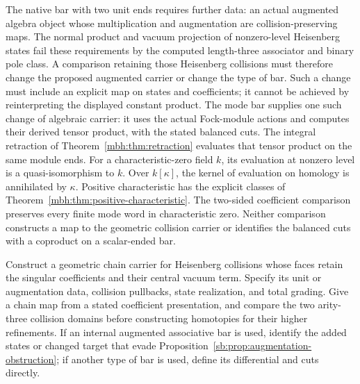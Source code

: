 The native bar with two unit ends requires further data:
an actual augmented algebra object whose multiplication and augmentation
are collision-preserving maps.  The normal product and vacuum projection
of nonzero-level Heisenberg states fail these requirements by the
computed length-three associator and binary pole class.
A comparison retaining those Heisenberg collisions must therefore
change the proposed augmented carrier or change the type of bar.
Such a change must include an explicit map on states and coefficients;
it cannot be achieved by reinterpreting the displayed constant product.
The mode bar supplies one such change of algebraic carrier: it uses
the actual Fock-module actions and computes their derived tensor product,
with the stated balanced cuts.  The integral retraction of
Theorem~\ref{mbh:thm:retraction} evaluates that tensor product on the
same module ends.  For a characteristic-zero field \(k\), its
evaluation at nonzero level is a quasi-isomorphism to \(k\).
Over \(k[\kappa]\), the kernel of evaluation on homology is
annihilated by \(\kappa\).  Positive characteristic has the
explicit classes of
Theorem~\ref{mbh:thm:positive-characteristic}.
The two-sided coefficient comparison preserves every finite mode word
in characteristic zero.  Neither comparison constructs a map to the
geometric collision carrier or identifies the balanced cuts with a
coproduct on a scalar-ended bar.

\begin{problem}
Construct a geometric chain carrier for Heisenberg collisions whose
faces retain the singular coefficients and their central vacuum term.
Specify its unit or augmentation data, collision pullbacks, state
realization, and total grading.  Give a chain map from a stated
coefficient presentation, and compare the two arity-three collision
domains before constructing homotopies for their higher refinements.
If an internal augmented associative bar is used, identify the added
states or changed target that evade
Proposition~\ref{sb:prop:augmentation-obstruction}; if another type of
bar is used, define its differential and cuts directly.
\end{problem}
